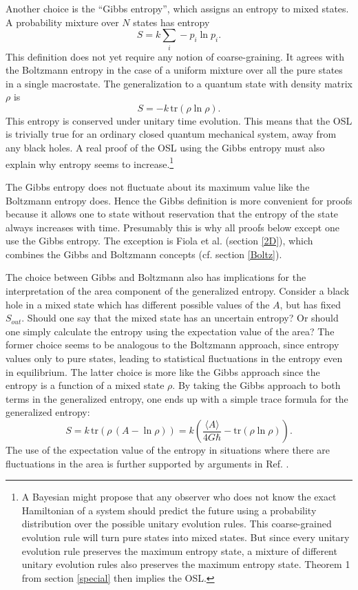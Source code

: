 \documentclass[12pt]{article}
\begin{document}
Another choice is the ``Gibbs entropy'', which assigns an entropy to mixed states.  A probability mixture over $N$ states has entropy
\begin{equation}
S = k\sum_i -p_i\ln p_i.
\end{equation}
This definition does not yet require any notion of coarse-graining.  It agrees with the Boltzmann entropy in the case of a uniform mixture over all the pure states in a single macrostate.  The generalization to a quantum state with density matrix $\rho$ is
\begin{equation}
S = -k\,\mathrm{tr}(\rho \ln \rho).
\end{equation} 
This entropy is conserved under unitary time evolution.  This means that the OSL is trivially true for an ordinary closed quantum mechanical system, away from any black holes.  A real proof of the OSL using the Gibbs entropy must also explain why entropy seems to increase.\footnote{A Bayesian might propose that any observer who does not know the exact Hamiltonian of a system should predict the future using a probability distribution over the possible unitary evolution rules.  This coarse-grained evolution rule will turn pure states into mixed states.  But since every unitary evolution rule preserves the maximum entropy state, a mixture of different unitary evolution rules also preserves the maximum entropy state.  Theorem 1 from section \ref{special} then implies the OSL.}

The Gibbs entropy does not fluctuate about its maximum value like the Boltzmann entropy does.  Hence the Gibbs definition is more convenient for proofs because it allows one to state without reservation that the entropy of the state always increases with time.  Presumably this is why all proofs below except one use the Gibbs entropy.  The exception is Fiola et al. \cite{fiola94} (section \ref{2D}), which combines the Gibbs and Boltzmann concepts (cf. section \ref{Boltz}).

The choice between Gibbs and Boltzmann also has implications for the interpretation of the area component of the generalized entropy.  Consider a black hole in a mixed state which has different possible values of the $A$, but has fixed $S_{out}$.  Should one say that the mixed state has an uncertain entropy?  Or should one simply calculate the entropy using the expectation value of the area?  The former choice seems to be analogous to the Boltzmann approach, since entropy values only to pure states, leading to statistical fluctuations in the entropy even in equilibrium.  The latter choice is more like the Gibbs approach since the entropy is a function of a mixed state $\rho$.  By taking the Gibbs approach to both terms in the generalized entropy, one ends up with a simple trace formula for the generalized entropy:
\begin{equation}
S = k\,\mathrm{tr}(\rho\,(A - \ln \rho)) = k \left(\frac{\langle A \rangle}{4G \hbar} - 
\mathrm{tr}(\rho\ln \rho) \right).
\end{equation}
The use of the expectation value of the entropy in situations where there are fluctuations in the area is further supported by arguments in Ref. \cite{SS99}.
\end{document}
